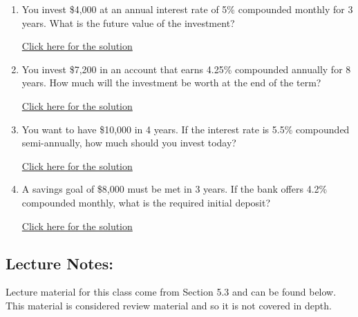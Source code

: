 \documentclass[
]{book}
\providecommand{\tightlist}{%
  \setlength{\itemsep}{0pt}\setlength{\parskip}{0pt}}
\begin{document}
\begin{enumerate}
\def\labelenumi{\arabic{enumi}.}
\tightlist
\item
  You invest \$4,000 at an annual interest rate of 5\% compounded monthly for 3 years. What is the future value of the investment?

  \href{https://youtu.be/Csdbw7AIGSA}{Click here for the solution}
\item
  You invest \$7,200 in an account that earns 4.25\% compounded annually for 8 years. How much will the investment be worth at the end of the term?

  \href{https://youtu.be/4vo1QE6fmXE}{Click here for the solution}
\item
  You want to have \$10,000 in 4 years. If the interest rate is 5.5\% compounded semi-annually, how much should you invest today?

  \href{https://youtu.be/AZg71adyIfo}{Click here for the solution}
\item
  A savings goal of \$8,000 must be met in 3 years. If the bank offers 4.2\% compounded monthly, what is the required initial deposit?

  \href{https://youtu.be/hCXRx8LGUe4}{Click here for the solution}
\end{enumerate}

\subsection*{Lecture Notes:}\label{lecture-notes-10}

Lecture material for this class come from Section 5.3 and can be found below. This material is considered review material and so it is not covered in depth.
\end{document}
